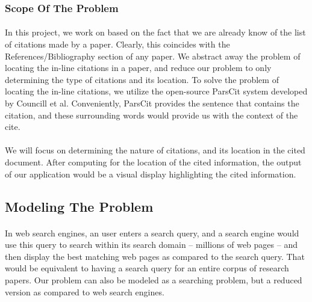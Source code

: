 \documentclass[12 pt]{article}
\begin{document}
\subsubsection{Scope Of The Problem}
\paragraph{}
In this project, we work on based on the fact that we are already know of the list of citations made by a paper. Clearly, this coincides with the References/Bibliography section of any paper. We abstract away the problem of locating the in-line citations in a paper, and reduce our problem to only determining the type of citations and its location. To solve the problem of locating the in-line citations, we utilize the open-source ParsCit\cite{parscit} system developed by Councill et al. Conveniently, ParsCit provides the sentence that contains the citation, and these surrounding words would provide us with the context of the cite.

\paragraph{}
We will focus on determining the nature of citations, and its location in the cited document. After computing for the location of the cited information, the output of our application would be a visual display highlighting the cited information.

\subsection{Modeling The Problem}
\paragraph{}
In web search engines, an user enters a search query, and a search engine would use this query to search within its search domain -- millions of web pages -- and then display the best matching web pages as compared to the search query. That would be equivalent to having a search query for an entire corpus of research papers. Our problem can also be modeled as a searching problem, but a reduced version as compared to web search engines.
\end{document}

